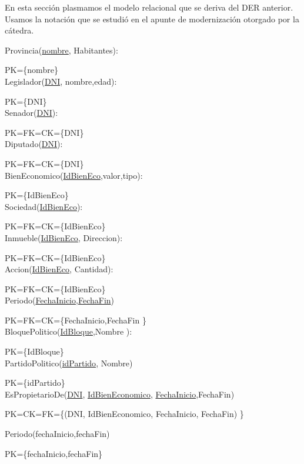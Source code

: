 En esta secci\'on plasmamos el modelo relacional que se deriva del DER anterior. Usamos la notaci\'on que se estudi\'o en el apunte de modernizaci\'on otorgado por la c\'atedra.

Provincia(\underline{nombre}, Habitantes):

PK={\{nombre}\}\\

Legislador(\underline{DNI}, nombre,edad):

PK={\{DNI}\}\\

Senador(\underline{DNI}):

PK=FK=CK={\{DNI}\}\\

Diputado(\underline{DNI}):

PK=FK=CK={\{DNI}\}\\

BienEconomico(\underline{IdBienEco},valor,tipo):

PK={\{IdBienEco}\}\\

Sociedad(\underline{IdBienEco}):

PK=FK=CK={\{IdBienEco}\}\\

Inmueble(\underline{IdBienEco}, Direccion):

PK=FK=CK={\{IdBienEco}\}\\

Accion(\underline{IdBienEco}, Cantidad):

PK=FK=CK={\{IdBienEco}\}\\

Periodo(\underline{FechaInicio},\underline{FechaFin})

PK=FK=CK={\{FechaInicio,FechaFin }\}\\

BloquePolitico(\underline{IdBloque},Nombre ):

PK={\{IdBloque}\}\\

PartidoPolitico(\underline{idPartido}, Nombre)

PK={\{idPartido}\}\\

EsPropietarioDe(\underline{DNI}, \underline{IdBienEconomico}, \underline{FechaInicio},FechaFin)

PK=CK=FK={\{(DNI, IdBienEconomico, FechaInicio, FechaFin) }\}

Periodo(fechaInicio,fechaFin)

PK={\{fechaInicio,fechaFin}\}\\

